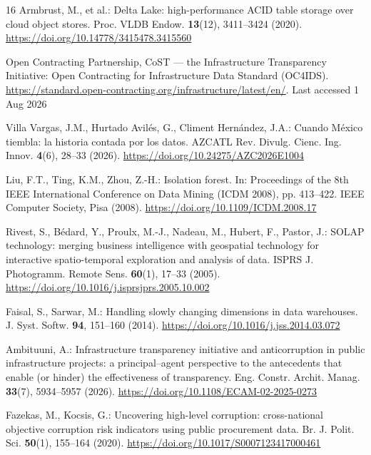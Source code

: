 \documentclass[runningheads]{llncs}
\renewcommand{\_}{\origunderscore\allowbreak}
\begin{document}
\begin{thebibliography}{16}
Armbrust, M., et al.: Delta Lake: high-performance ACID table storage over cloud object stores. Proc. VLDB Endow. \textbf{13}(12), 3411--3424 (2020). \url{https://doi.org/10.14778/3415478.3415560}

Open Contracting Partnership, CoST --- the Infrastructure Transparency Initiative: Open Contracting for Infrastructure Data Standard (OC4IDS). \url{https://standard.open-contracting.org/infrastructure/latest/en/}. Last accessed 1 Aug 2026

Villa Vargas, J.M., Hurtado Avil\'es, G., Climent Hern\'andez, J.A.: Cuando M\'exico tiembla: la historia contada por los datos. AZCATL Rev. Divulg. Cienc. Ing. Innov. \textbf{4}(6), 28--33 (2026). \url{https://doi.org/10.24275/AZC2026E1004}


Liu, F.T., Ting, K.M., Zhou, Z.-H.: Isolation forest. In: Proceedings of the 8th IEEE International Conference on Data Mining (ICDM 2008), pp. 413--422. IEEE Computer Society, Pisa (2008). \url{https://doi.org/10.1109/ICDM.2008.17}

Rivest, S., B\'edard, Y., Proulx, M.-J., Nadeau, M., Hubert, F., Pastor, J.: SOLAP technology: merging business intelligence with geospatial technology for interactive spatio-temporal exploration and analysis of data. ISPRS J. Photogramm. Remote Sens. \textbf{60}(1), 17--33 (2005). \url{https://doi.org/10.1016/j.isprsjprs.2005.10.002}

Faisal, S., Sarwar, M.: Handling slowly changing dimensions in data warehouses. J. Syst. Softw. \textbf{94}, 151--160 (2014). \url{https://doi.org/10.1016/j.jss.2014.03.072}

Ambituuni, A.: Infrastructure transparency initiative and anticorruption in public infrastructure projects: a principal--agent perspective to the antecedents that enable (or hinder) the effectiveness of transparency. Eng. Constr. Archit. Manag. \textbf{33}(7), 5934--5957 (2026). \url{https://doi.org/10.1108/ECAM-02-2025-0273}

Fazekas, M., Kocsis, G.: Uncovering high-level corruption: cross-national objective corruption risk indicators using public procurement data. Br. J. Polit. Sci. \textbf{50}(1), 155--164 (2020). \url{https://doi.org/10.1017/S0007123417000461}

\end{thebibliography}\endgroup
\end{document}
